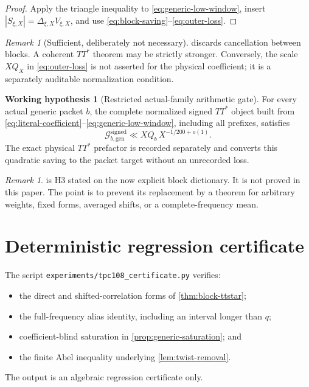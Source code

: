 \documentclass[11pt]{article}
\theoremstyle{definition}
\newtheorem{hypothesis}[theorem]{Working hypothesis}
\theoremstyle{remark}
\newtheorem{remark}[theorem]{Remark}
\begin{document}
\begin{proof}
Apply the triangle inequality to
\eqref{eq:generic-low-window}, insert
\(|S_{\xi,X}|=\Delta_{\xi,X}V_{\xi,X}\), and use
\eqref{eq:block-saving}--\eqref{eq:outer-loss}.
\end{proof}

\begin{remark}[Sufficient, deliberately not necessary]
 discards cancellation between blocks.  A
coherent \(TT^*\) theorem may be strictly stronger.  Conversely,
the scale \(XQ_X\) in \eqref{eq:outer-loss} is not asserted for the
physical coefficient; it is a separately auditable normalization
condition.
\end{remark}

\begin{hypothesis}[Restricted actual-family arithmetic gate]
\label{hyp:restricted-gate}
For every actual generic packet \(b\), the complete normalized
signed \(TT^*\) object built from
\eqref{eq:literal-coefficient}--\eqref{eq:generic-low-window},
including all prefixes, satisfies
\[
 \mathcal G_{b,\mathrm{gen}}^{\mathrm{signed}}
 \ll XQ_b\,X^{-1/200+o(1)}.
\]
The exact physical \(TT^*\) prefactor is recorded separately and
converts this quadratic saving to the packet target without an
unrecorded loss.
\end{hypothesis}

\begin{remark}
 is H3 stated on the now explicit
block dictionary.  It is not proved in this paper.  The point is to
prevent its replacement by a theorem for arbitrary weights, fixed
forms, averaged shifts, or a complete-frequency mean.
\end{remark}

\section{Deterministic regression certificate}

The script \texttt{experiments/tpc108\_certificate.py} verifies:
\begin{itemize}[leftmargin=2em]
\item the direct and shifted-correlation forms of
\cref{thm:block-ttstar};
\item the full-frequency alias identity, including an interval
longer than \(q\);
\item coefficient-blind saturation in
\cref{prop:generic-saturation}; and
\item the finite Abel inequality underlying
\cref{lem:twist-removal}.
\end{itemize}
The output is an algebraic regression certificate only.
\end{document}
